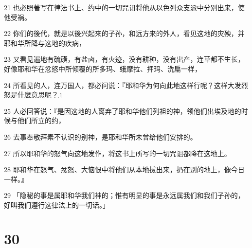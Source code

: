 \par 21 也必照著写在律法书上、约中的一切咒诅将他从以色列众支派中分别出来，使他受祸。
\par 22 你们的後代，就是以後兴起来的子孙，和远方来的外人，看见这地的灾殃，并耶和华所降与这地的疾病，
\par 23 又看见遍地有硫磺，有盐卤，有火迹，没有耕种，没有出产，连草都不生长，好像耶和华在忿怒中所倾覆的所多玛、蛾摩拉、押玛、洗扁一样，
\par 24 所看见的人，连万国人，都必问说：『耶和华为何向此地这样行呢？这样大发烈怒是什麽意思呢？』
\par 25 人必回答说：『是因这地的人离弃了耶和华他们列祖的神，领他们出埃及地的时候与他们所立的约，
\par 26 去事奉敬拜素不认识的别神，是耶和华所未曾给他们安排的。
\par 27 所以耶和华的怒气向这地发作，将这书上所写的一切咒诅都降在这地上。
\par 28 耶和华在怒气、忿怒、大恼恨中将他们从本地拔出来，扔在别的地上，像今日一样。』
\par 29 「隐秘的事是属耶和华我们神的；惟有明显的事是永远属我们和我们子孙的，好叫我们遵行这律法上的一切话。」

\chapter{30}


